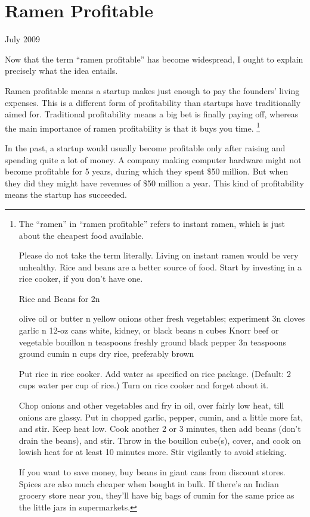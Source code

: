 \chapter{Ramen Profitable}

July 2009

Now that the term ``ramen profitable'' has become widespread, I ought to
explain precisely what the idea entails.

Ramen profitable means a startup makes just enough to pay the founders'
living expenses. This is a different form of profitability than startups
have traditionally aimed for. Traditional profitability means a big bet
is finally paying off, whereas the main importance of ramen
profitability is that it buys you time. \footnote{The ``ramen'' in ``ramen profitable'' refers to instant ramen,
which is just about the cheapest food available.

Please do not take the term literally. Living on instant ramen would be
very unhealthy. Rice and beans are a better source of food. Start by
investing in a rice cooker, if you don't have one.

Rice and Beans for 2n

olive oil or butter n yellow onions other fresh vegetables; experiment
3n cloves garlic n 12-oz cans white, kidney, or black beans n cubes
Knorr beef or vegetable bouillon n teaspoons freshly ground black pepper
3n teaspoons ground cumin n cups dry rice, preferably brown

Put rice in rice cooker. Add water as specified on rice package.
(Default: 2 cups water per cup of rice.) Turn on rice cooker and forget
about it.

Chop onions and other vegetables and fry in oil, over fairly low heat,
till onions are glassy. Put in chopped garlic, pepper, cumin, and a
little more fat, and stir. Keep heat low. Cook another 2 or 3 minutes,
then add beans (don't drain the beans), and stir. Throw in the bouillon
cube(s), cover, and cook on lowish heat for at least 10 minutes more.
Stir vigilantly to avoid sticking.

If you want to save money, buy beans in giant cans from discount stores.
Spices are also much cheaper when bought in bulk. If there's an Indian
grocery store near you, they'll have big bags of cumin for the same
price as the little jars in supermarkets.}

In the past, a startup would usually become profitable only after
raising and spending quite a lot of money. A company making computer
hardware might not become profitable for 5 years, during which they
spent \$50 million. But when they did they might have revenues of \$50
million a year. This kind of profitability means the startup has
succeeded.

